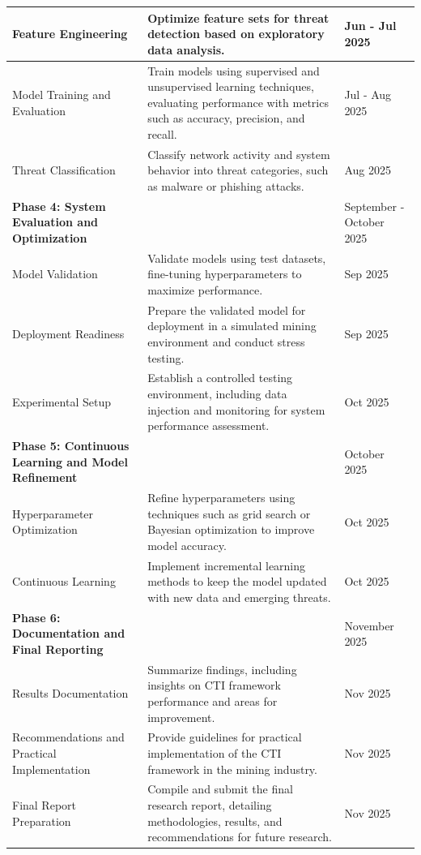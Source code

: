 \documentclass[a4paper,twoside,12pt]{report}
\begin{document}
\begin{longtable}{|p{4cm}|p{9.5cm}|p{2.5cm}|}
    \hline
    Feature Engineering & Optimize feature sets for threat detection based on exploratory data analysis. & Jun - Jul 2025 \\
    \hline
    Model Training and Evaluation & Train models using supervised and unsupervised learning techniques, evaluating performance with metrics such as accuracy, precision, and recall. & Jul - Aug 2025 \\
    \hline
    Threat Classification & Classify network activity and system behavior into threat categories, such as malware or phishing attacks. & Aug 2025 \\
    \hline
    \textbf{Phase 4: System Evaluation and Optimization} & & September - October 2025 \\
    \hline
    Model Validation & Validate models using test datasets, fine-tuning hyperparameters to maximize performance. & Sep 2025 \\
    \hline
    Deployment Readiness & Prepare the validated model for deployment in a simulated mining environment and conduct stress testing. & Sep 2025 \\
    \hline
    Experimental Setup & Establish a controlled testing environment, including data injection and monitoring for system performance assessment. & Oct 2025 \\
    \hline
    \textbf{Phase 5: Continuous Learning and Model Refinement} & & October 2025 \\
    \hline
    Hyperparameter Optimization & Refine hyperparameters using techniques such as grid search or Bayesian optimization to improve model accuracy. & Oct 2025 \\
    \hline
    Continuous Learning & Implement incremental learning methods to keep the model updated with new data and emerging threats. & Oct 2025 \\
    \hline
    \textbf{Phase 6: Documentation and Final Reporting} & & November 2025 \\
    \hline
    Results Documentation & Summarize findings, including insights on CTI framework performance and areas for improvement. & Nov 2025 \\
    \hline
    Recommendations and Practical Implementation & Provide guidelines for practical implementation of the CTI framework in the mining industry. & Nov 2025 \\
    \hline
    Final Report Preparation & Compile and submit the final research report, detailing methodologies, results, and recommendations for future research. & Nov 2025 \\
\end{longtable}
\end{document}
